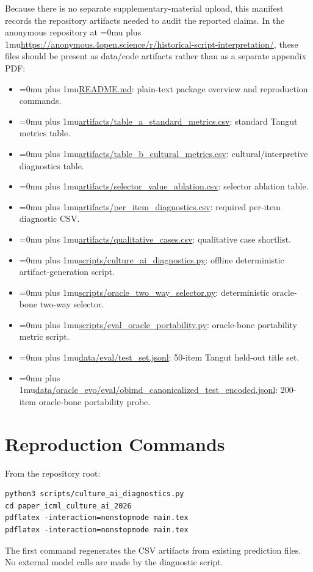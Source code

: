\documentclass{article}
\newcommand{\pathcode}[1]{{\begingroup\Urlmuskip=0mu plus 1mu\url{#1}\endgroup}}
\begin{document}
Because there is no separate supplementary-material upload, this manifest records the repository artifacts needed to audit the reported claims. In the anonymous repository at \pathcode{https://anonymous.4open.science/r/historical-script-interpretation/}, these files should be present as data/code artifacts rather than as a separate appendix PDF:
\begin{itemize}
    \item \pathcode{README.md}: plain-text package overview and reproduction commands.
    \item \pathcode{artifacts/table_a_standard_metrics.csv}: standard Tangut metrics table.
    \item \pathcode{artifacts/table_b_cultural_metrics.csv}: cultural/interpretive diagnostics table.
    \item \pathcode{artifacts/selector_value_ablation.csv}: selector ablation table.
    \item \pathcode{artifacts/per_item_diagnostics.csv}: required per-item diagnostic CSV.
    \item \pathcode{artifacts/qualitative_cases.csv}: qualitative case shortlist.
    \item \pathcode{scripts/culture_ai_diagnostics.py}: offline deterministic artifact-generation script.
    \item \pathcode{scripts/oracle_two_way_selector.py}: deterministic oracle-bone two-way selector.
    \item \pathcode{scripts/eval_oracle_portability.py}: oracle-bone portability metric script.
    \item \pathcode{data/eval/test_set.jsonl}: 50-item Tangut held-out title set.
    \item \pathcode{data/oracle_evo/eval/obimd_canonicalized_test_encoded.jsonl}: 200-item oracle-bone portability probe.
\end{itemize}

\section{Reproduction Commands}

From the repository root:
\begin{verbatim}
python3 scripts/culture_ai_diagnostics.py
cd paper_icml_culture_ai_2026
pdflatex -interaction=nonstopmode main.tex
pdflatex -interaction=nonstopmode main.tex
\end{verbatim}

The first command regenerates the CSV artifacts from existing prediction files. No external model calls are made by the diagnostic script.
\end{document}
